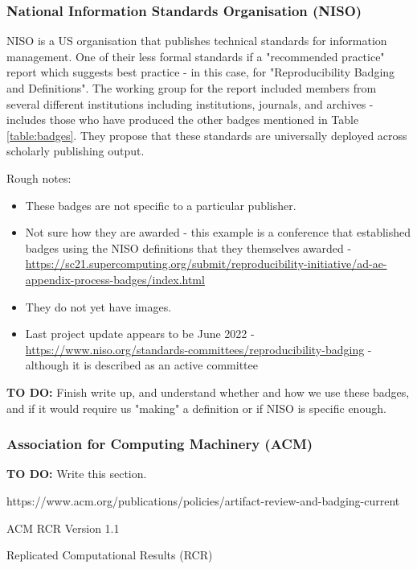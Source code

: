 \subsubsection{National Information Standards Organisation (NISO)}

NISO is a US organisation that publishes technical standards for information management. One of their less formal standards if a "recommended practice"  report which suggests best practice - in this case, for "Reproducibility Badging and Definitions". The working group for the report included members from several different institutions including institutions, journals, and archives - includes those who have produced the other badges mentioned in Table \ref{table:badges}. They propose that these standards are universally deployed across scholarly publishing output.\autocite{niso_reproducibility_badging_and_definitions_working_group_reproducibility_2021}

Rough notes:
\begin{itemize}
    \item These badges are not specific to a particular publisher.
    \item Not sure how they are awarded - this example is a conference that established badges using the NISO definitions that they themselves awarded - \url{https://sc21.supercomputing.org/submit/reproducibility-initiative/ad-ae-appendix-process-badges/index.html}
    \item They do not yet have images.
    \item Last project update appears to be June 2022 - \url{https://www.niso.org/standards-committees/reproducibility-badging} - although it is described as an active committee
\end{itemize}

\textbf{TO DO:} Finish write up, and understand whether and how we use these badges, and if it would require us "making" a definition or if NISO is specific enough.

\subsubsection{Association for Computing Machinery (ACM)}

\textbf{TO DO:} Write this section.

https://www.acm.org/publications/policies/artifact-review-and-badging-current

ACM RCR Version 1.1

Replicated Computational Results (RCR)

